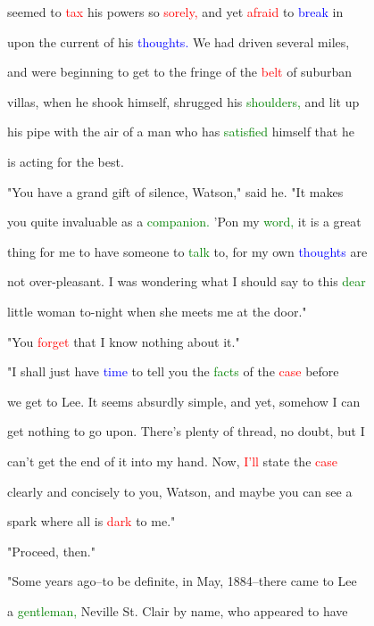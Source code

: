  seemed to \textcolor{red}{tax} his powers so \textcolor{red}{sorely,} and yet \textcolor{red}{afraid} to \textcolor{blue}{break} in

 upon the current of his \textcolor{blue}{thoughts.} We had driven several miles,

 and were beginning to get to the fringe of the \textcolor{red}{belt} of suburban

 villas, when he shook himself, shrugged his \textcolor{green}{shoulders,} and lit up

 his pipe with the air of a man who has \textcolor{green}{satisfied} himself that he

 is acting for the best.



 "You have a grand \textcolor{BurntOrange}{gift} of silence, Watson," said he. "It makes

 you quite invaluable as a \textcolor{green}{companion.} 'Pon my \textcolor{green}{word,} it is a great

 thing for me to have someone to \textcolor{green}{talk} to, for my own \textcolor{blue}{thoughts} are

 not over-pleasant. I was wondering what I should say to this \textcolor{green}{dear}

 little woman to-night when she meets me at the door."



 "You \textcolor{red}{forget} that I know nothing about it."



 "I shall just have \textcolor{blue}{time} to tell you the \textcolor{green}{facts} of the \textcolor{red}{case} before

 we get to Lee. It seems absurdly simple, and yet, somehow I can

 get nothing to go upon. There's plenty of thread, no \textcolor{BurntOrange}{doubt,} but I

 can't get the end of it into my hand. Now, \textcolor{red}{I'll} state the \textcolor{red}{case}

 clearly and concisely to you, Watson, and maybe you can see a

 spark where all is \textcolor{red}{dark} to me."



 "Proceed, then."



 "Some years ago--to be definite, in May, 1884--there came to Lee

 a \textcolor{green}{gentleman,} Neville St. Clair by name, who appeared to have

